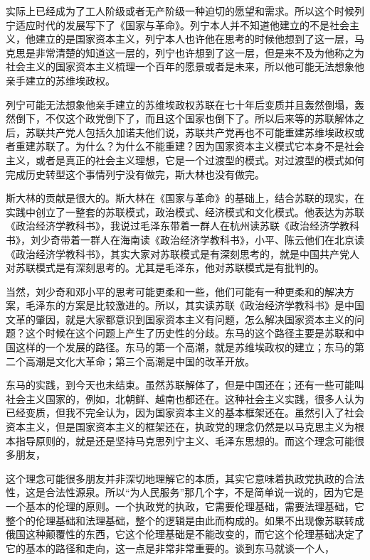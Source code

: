 \documentclass[UTF8, 12pt, a4paper]{ctexrep}
\begin{document}
实际上已经成为了工人阶级或者无产阶级一种迫切的愿望和需求。所以这个时候列宁适应时代的发展写下了《国家与革命》。列宁本人并不知道他建立的不是社会主义，他建立的是国家资本主义，列宁本人也许他在思考的时候他想到了这一层，马克思是非常清楚的知道这一层的，列宁也许想到了这一层，但是来不及为他称之为社会主义的国家资本主义梳理一个百年的愿景或者是未来，所以他可能无法想象他亲手建立的苏维埃政权。

列宁可能无法想象他亲手建立的苏维埃政权苏联在七十年后变质并且轰然倒塌，轰然倒下，不仅这个政党倒下了，而且这个国家也倒下了。所以后来等的苏联解体之后，苏联共产党人包括久加诺夫他们说，苏联共产党再也不可能重建苏维埃政权或者重建苏联了。为什么？为什么不能重建？因为国家资本主义模式它本身不是社会主义，或者是真正的社会主义理想，它是一个过渡型的模式。对过渡型的模式如何完成历史转型这个事情列宁没有做完，斯大林也没有做完。

斯大林的贡献是很大的。斯大林在《国家与革命》的基础上，结合苏联的现实，在实践中创立了一整套的苏联模式，政治模式、经济模式和文化模式。他表达为苏联《政治经济学教科书》，我说过毛泽东带着一群人在杭州读苏联《政治经济学教科书》，刘少奇带着一群人在海南读《政治经济学教科书》，小平、陈云他们在北京读《政治经济学教科书》，其实大家对苏联模式是有深刻思考的，就是中国共产党人对苏联模式是有深刻思考的。尤其是毛泽东，他对苏联模式是有批判的。

当然，刘少奇和邓小平的思考可能更柔和一些，他们可能有一种更柔和的解决方案，毛泽东的方案是比较激进的。所以，其实读苏联《政治经济学教科书》是中国文革的肇因，就是大家都意识到国家资本主义有问题，怎么解决国家资本主义的问题？这个时候在这个问题上产生了历史性的分歧。东马的这个路径主要是苏联和中国这样的一个发展的路径。东马的第一个高潮，就是苏维埃政权的建立；东马的第二个高潮是文化大革命；第三个高潮是中国的改革开放。

东马的实践，到今天也未结束。虽然苏联解体了，但是中国还在；还有一些可能叫社会主义国家的，例如，北朝鲜、越南也都还在。这种社会主义实践，很多人认为已经变质，但我不完全认为，因为国家资本主义的基本框架还在。虽然引入了社会资本主义，但是国家资本主义的框架还在，执政党的理念仍然是以马克思主义为根本指导原则的，就是还是坚持马克思列宁主义、毛泽东思想的。而这个理念可能很多朋友，

这个理念可能很多朋友并非深切地理解它的本质，其实它意味着执政党执政的合法性，这是合法性源泉。所以“为人民服务”那几个字，不是简单说一说的，因为它是一个基本的伦理的原则。一个执政党的执政，它需要伦理基础，需要法理基础，它整个的伦理基础和法理基础，整个的逻辑是由此而构成的。如果不出现像苏联转成俄国这种颠覆性的东西，它这个伦理基础是不能改变的，而它这个伦理基础决定了它的基本的路径和走向，这一点是非常非常重要的。谈到东马就谈一个人，
\end{document}

